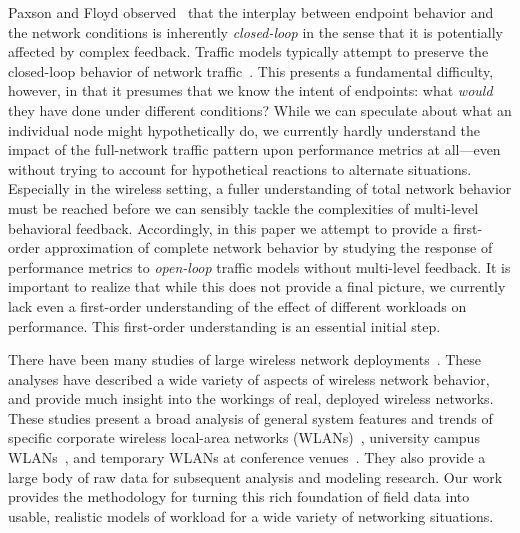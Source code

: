 \documentclass[twocolumn,final]{svjour3}
\newcommand{\caps}[1]{{\small{#1}}}
\begin{document}
Paxson and Floyd observed~\cite{Paxson95} that the interplay between endpoint behavior and the network conditions is inherently \textit{closed-loop} in the sense that it is potentially affected by complex feedback. Traffic models typically attempt to preserve the closed-loop behavior of network traffic~\cite{Avallone04,Hernandez06:dissertation}. This presents a fundamental difficulty, however, in that it presumes that we know the intent of endpoints: what \textit{would} they have done under different conditions? While we can speculate about what an individual node might hypothetically do, we currently hardly understand the impact of the full-network traffic pattern upon performance metrics at all---even without trying to account for hypothetical reactions to alternate situations. Especially in the wireless setting, a fuller understanding of total network behavior must be reached before we can sensibly tackle the complexities of multi-level behavioral feedback. Accordingly, in this paper we attempt to provide a first-order approximation of complete network behavior by studying the response of performance metrics to \textit{open-loop} traffic models without multi-level feedback. It is important to realize that while this does not provide a final picture, we currently lack even a first-order understanding of the effect of different workloads on performance. This first-order understanding is an essential initial step.

There have been many studies of large wireless network deployments~\cite{Tang99,Balachandran02,Balazinska03,Kotz02,Henderson04,Schwab04,Chinchilla04,Jardosh05:ewind}. These analyses have described a wide variety of aspects of wireless network behavior, and provide much insight into the workings of real, deployed wireless networks. These studies present a broad analysis of general system features and trends of specific corporate wireless local-area networks (\caps{WLAN}s)~\cite{Tang99,Balazinska03}, university campus \caps{WLAN}s~\cite{Tang00,Kotz02,Chinchilla04,Schwab04,Henderson04,Tuduce05}, and temporary \caps{WLAN}s at conference venues~\cite{Balachandran02,Jardosh05:ewind}. They also provide a large body of raw data for subsequent analysis and modeling research. Our work provides the methodology for turning this rich foundation of field data into usable, realistic models of workload for a wide variety of networking situations.
\end{document}
